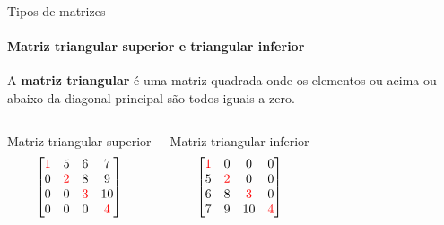 \begin{frame}[t]{Tipos de matrizes} 
    \framesubtitle{Matriz triangular superior e triangular inferior}

    A \textbf{matriz triangular} é uma matriz quadrada onde os elementos ou acima ou abaixo da diagonal principal são todos iguais a zero.
    \vspace*{0.8cm}


    \begin{columns}[c]
        \centering
        Matriz triangular superior
        \begin{equation}
                \begin{bmatrix}
                \textcolor{red}{1} & 5 & 6 & 7\\
                0 & \textcolor{red}{2} & 8 & 9\\
                0 & 0 & \textcolor{red}{3} & 10\\ 
                0 & 0 & 0 & \textcolor{red}{4}\\ 
             \end{bmatrix}
        \end{equation}
    
       \centering
       Matriz triangular inferior
       \begin{equation}
               \begin{bmatrix}
               \textcolor{red}{1} & 0 & 0 & 0\\
               5 & \textcolor{red}{2} & 0 & 0\\
               6 & 8 & \textcolor{red}{3} & 0\\ 
               7 & 9 & 10 & \textcolor{red}{4}\\ 
            \end{bmatrix}
       \end{equation}
   \end{columns}
\end{frame}
